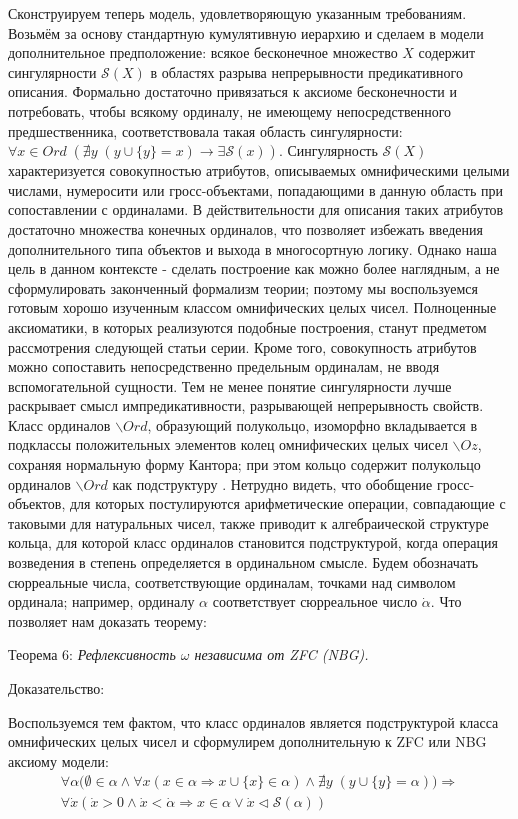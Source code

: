 \documentclass[12pt]{article}
\begin{document}
Сконструируем теперь модель, удовлетворяющую указанным требованиям. Возьмём за основу стандартную кумулятивную иерархию и сделаем в модели дополнительное предположение: всякое бесконечное множество $X$ содержит сингулярности $\mathcal{S}(X)$ в областях разрыва непрерывности предикативного описания. Формально достаточно привязаться к аксиоме бесконечности и потребовать, чтобы всякому ординалу, не имеющему непосредственного предшественника, соответствовала такая область сингулярности: $\forall x \in Ord \; (\nexists y \; (y \cup \{ y\} = x) \to \exists \mathcal{S}(x))$. Сингулярность $\mathcal{S}(X)$ характеризуется совокупностью атрибутов, описываемых омнифическими целыми числами, нумеросити или гросс-объектами, попадающими в данную область при сопоставлении с ординалами. В действительности для описания таких атрибутов достаточно множества конечных ординалов, что позволяет избежать введения дополнительного типа объектов и выхода в многосортную логику. Однако наша цель в данном контексте - сделать построение как можно более наглядным, а не сформулировать законченный формализм теории; поэтому мы воспользуемся готовым хорошо изученным классом омнифических целых чисел. Полноценные аксиоматики, в которых реализуются подобные построения, станут предметом рассмотрения следующей статьи серии. Кроме того, совокупность атрибутов можно сопоставить непосредственно предельным ординалам, не вводя вспомогательной сущности. Тем не менее понятие сингулярности лучше раскрывает смысл импредикативности, разрывающей непрерывность свойств. Класс ординалов ${\backslash}Ord$, образующий полукольцо, изоморфно вкладывается в подклассы положительных элементов колец омнифических целых чисел ${\backslash}Oz$, сохраняя нормальную форму Кантора; при этом кольцо содержит полукольцо ординалов ${\backslash}Ord$ как подструктуру \cite{conway-omnific-integers}. Нетрудно видеть, что обобщение гросс-объектов, для которых постулируются арифметические операции, совпадающие с таковыми для натуральных чисел, также приводит к алгебраической структуре кольца, для которой класс ординалов становится подструктурой, когда операция возведения в степень определяется в ординальном смысле. Будем обозначать сюрреальные числа, соответствующие ординалам, точками над символом ординала; например, ординалу $\alpha$ соответствует сюрреальное число $\dot{\alpha}$. Что позволяет нам доказать теорему:

Теорема 6: {\sl Рефлексивность $\omega$ независима от ZFC (NBG).}

Доказательство: 

Воспользуемся тем фактом, что класс ординалов является подструктурой класса омнифических целых чисел и сформулирем дополнительную к ZFC или NBG аксиому модели:
\begin{equation}
\begin{gathered}
\forall \alpha \bigl(\emptyset \in \alpha \wedge \forall x (x \in \alpha \Rightarrow x \cup \{ x \} \in \alpha) \wedge \nexists y \; (y \cup \{ y\} = \alpha)\bigr) \Rightarrow \\
 \forall \dot{x} (\dot{x} > 0 \wedge \dot{x} < \dot{\alpha} \Rightarrow x \in \alpha \vee \dot{x} \triangleleft \mathcal{S}(\alpha))
\label{axiom:singularity}
\end{gathered}
\end{equation}
\end{document}
